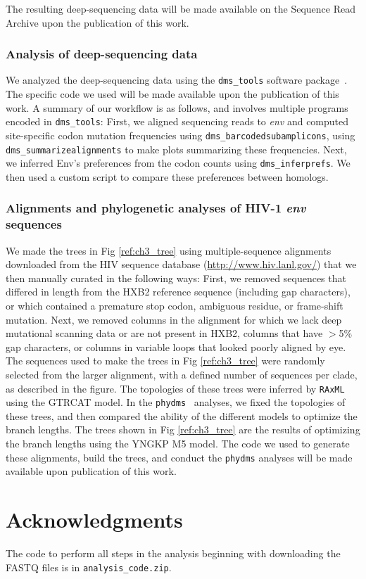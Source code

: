 \documentclass[9pt]{elife}
\begin{document}
The resulting deep-sequencing data will be made available on the Sequence Read Archive upon the publication of this work.

\subsubsection*{Analysis of deep-sequencing data}

We analyzed the deep-sequencing data using the \texttt{dms\_tools} software package~\cite{bloom2015software}.
The specific code we used will be made available upon the publication of this work.
A summary of our workflow is as follows, and involves multiple programs encoded in \texttt{dms\_tools}:
First, we aligned sequencing reads to \textit{env} and computed site-specific codon mutation frequencies using \texttt{dms\_barcodedsubamplicons}, using \texttt{dms\_summarizealignments} to make plots summarizing these frequencies.
Next, we inferred Env's preferences from the codon counts using \texttt{dms\_inferprefs}.
We then used a custom script to compare these preferences between homologs.

\subsubsection*{Alignments and phylogenetic analyses of HIV-1 {\it env} sequences}
We made the trees in Fig \ref{ref:ch3_tree} using multiple-sequence alignments downloaded from the HIV sequence database (\url{http://www.hiv.lanl.gov/}) that we then manually curated in the following ways:
First, we removed sequences that differed in length from the HXB2 reference sequence (including gap characters), or which contained a premature stop codon, ambiguous residue, or frame-shift mutation.
Next, we removed columns in the alignment for which we lack deep mutational scanning data or are not present in HXB2, columns that have $>$5\% gap characters, or columns in variable loops that looked poorly aligned by eye.
The sequences used to make the trees in Fig \ref{ref:ch3_tree} were randomly selected from the larger alignment, with a defined number of sequences per clade, as described in the figure.
The topologies of these trees were inferred by \texttt{RAxML} using the GTRCAT model.
In the \texttt{phydms}~\cite{hilton2017phydms} analyses, we fixed the topologies of these trees, and then compared the ability of the different models to optimize the branch lengths.
The trees shown in Fig \ref{ref:ch3_tree} are the results of optimizing the branch lengths using the YNGKP M5 model.
The code we used to generate these alignments, build the trees, and conduct the \texttt{phydms} analyses will be made available upon publication of this work.

\section{Acknowledgments}



\begin{suppfile}
\caption{
\label{suppfile:code}
The code to perform all steps in the analysis beginning with downloading the FASTQ files is in \texttt{analysis\_code.zip}.}
\end{suppfile}
\end{document}
